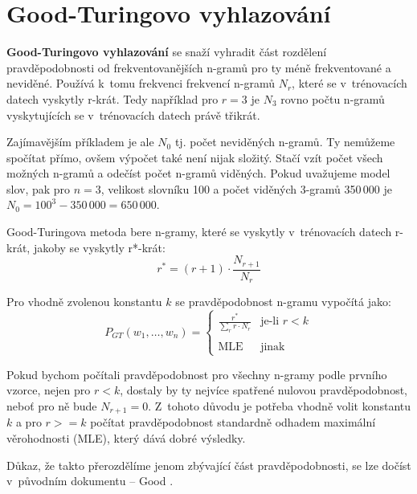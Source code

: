 \documentclass[12pt,a4paper]{report}
\begin{document}
\section{Good-Turingovo vyhlazování}
\textbf{Good-Turingovo vyhlazování} se snaží vyhradit část rozdělení pravděpodobnosti od frekventovanějších n-gramů pro ty méně frekventované a neviděné. Používá k~tomu frekvenci frekvencí n-gramů $N_r$, které se v~trénovacích datech vyskytly r-krát. Tedy například pro $r=3$ je $N_3$ rovno počtu n-gramů vyskytujících se v~trénovacích datech právě třikrát. 

Zajímavějším příkladem je ale $N_0$ tj. počet neviděných n-gramů. Ty nemůžeme spočítat přímo, ovšem výpočet také není nijak složitý. Stačí vzít počet všech možných n-gramů a odečíst počet n-gramů viděných. Pokud uvažujeme model slov, pak pro $n=3$, velikost slovníku 100 a počet viděných 3-gramů 350\,000 je $N_0 = 100^3 - 350\,000 = 650\,000$.

Good-Turingova metoda bere n-gramy, které se vyskytly v~trénovacích datech r-krát, jakoby se vyskytly r*-krát:
\begin{equation}\label{eq:gtr1}
r^* = (r+1) \cdot \frac {N_{r+1}}{N_r}
\end{equation}

Pro vhodně zvolenou konstantu $k$ se pravděpodobnost n-gramu vypočítá jako:
\begin{equation}
P_{GT}(w_{1},\ldots,w_{n}) = \left\{
\begin{array}{ll}
\displaystyle \frac{r^*}{\sum_{r}r\cdot N_r} & \text{je-li $r < k$}\\
&\\
\text{MLE} & \text{jinak}
\end{array} \right.
\end{equation}

Pokud bychom počítali pravděpodobnost pro všechny n-gramy podle prvního vzorce, nejen pro $r < k$, dostaly by ty nejvíce spatřené nulovou pravděpodobnost, neboť pro ně bude $N_{r+1} = 0$. Z~tohoto důvodu je potřeba vhodně volit konstantu $k$ a pro $r >= k$ počítat pravděpodobnost standardně odhadem maximální věrohodnosti (MLE), který dává dobré výsledky.

Důkaz, že takto přerozdělíme jenom zbývající část pravděpodobnosti, se lze dočíst v~původním dokumentu -- Good \cite{turing}.

\end{document}
